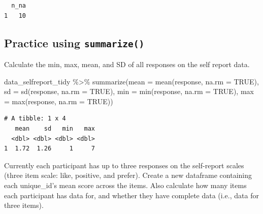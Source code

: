 \documentclass[
  letterpaper,
  DIV=11,
  numbers=noendperiod]{scrreprt}
\newenvironment{Shaded}{\begin{snugshade}}{\end{snugshade}}
\newcommand{\AttributeTok}[1]{\textcolor[rgb]{0.40,0.45,0.13}{#1}}
\newcommand{\ConstantTok}[1]{\textcolor[rgb]{0.56,0.35,0.01}{#1}}
\newcommand{\FunctionTok}[1]{\textcolor[rgb]{0.28,0.35,0.67}{#1}}
\newcommand{\NormalTok}[1]{\textcolor[rgb]{0.00,0.23,0.31}{#1}}
\newcommand{\SpecialCharTok}[1]{\textcolor[rgb]{0.37,0.37,0.37}{#1}}
\begin{document}
\begin{verbatim}
  n_na
1   10
\end{verbatim}

\subsection{\texorpdfstring{Practice using
\texttt{summarize()}}{Practice using summarize()}}\label{practice-using-summarize}

Calculate the min, max, mean, and SD of all responses on the self report
data.

\begin{Shaded}
\begin{Highlighting}[]
\NormalTok{data\_selfreport\_tidy }\SpecialCharTok{\%\textgreater{}\%}
  \FunctionTok{summarize}\NormalTok{(}\AttributeTok{mean =} \FunctionTok{mean}\NormalTok{(response, }\AttributeTok{na.rm =} \ConstantTok{TRUE}\NormalTok{),}
            \AttributeTok{sd =} \FunctionTok{sd}\NormalTok{(response, }\AttributeTok{na.rm =} \ConstantTok{TRUE}\NormalTok{),}
            \AttributeTok{min =} \FunctionTok{min}\NormalTok{(response, }\AttributeTok{na.rm =} \ConstantTok{TRUE}\NormalTok{),}
            \AttributeTok{max =} \FunctionTok{max}\NormalTok{(response, }\AttributeTok{na.rm =} \ConstantTok{TRUE}\NormalTok{))}
\end{Highlighting}
\end{Shaded}

\begin{verbatim}
# A tibble: 1 x 4
   mean    sd   min   max
  <dbl> <dbl> <dbl> <dbl>
1  1.72  1.26     1     7
\end{verbatim}

Currently each participant has up to three responses on the self-report
scales (three item scale: like, positive, and prefer). Create a new
dataframe containing each unique\_id's mean score across the items. Also
calculate how many items each participant has data for, and whether they
have complete data (i.e., data for three items).
\end{document}
